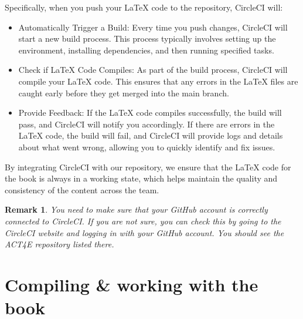 \documentclass{article}
\newtheorem{remark}{Remark}
\begin{document}
Specifically, when you push your LaTeX code to the repository, CircleCI will:
\begin{itemize}
\item Automatically Trigger a Build: Every time you push changes, CircleCI will start a new build process. This process typically involves setting up the environment, installing dependencies, and then running specified tasks.

\item Check if LaTeX Code Compiles: As part of the build process, CircleCI will compile your LaTeX code. This ensures that any errors in the LaTeX files are caught early before they get merged into the main branch.

\item Provide Feedback: If the LaTeX code compiles successfully, the build will pass, and CircleCI will notify you accordingly. If there are errors in the LaTeX code, the build will fail, and CircleCI will provide logs and details about what went wrong, allowing you to quickly identify and fix issues.
\end{itemize}

By integrating CircleCI with our repository, we ensure that the LaTeX code for the book is always in a working state, which helps maintain the quality and consistency of the content across the team.

\begin{remark}
    You need to make sure that your GitHub account is correctly connected to CircleCI. If you are not sure, you can check this by going to the CircleCI website and logging in with your GitHub account. You should see the ACT4E repository listed there.
\end{remark}

\section{Compiling \& working with the book}
\end{document}
